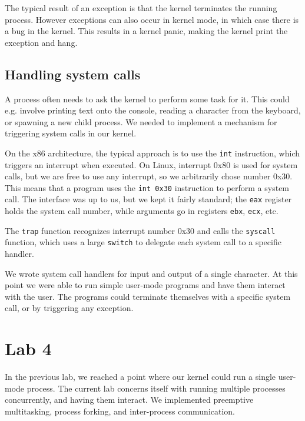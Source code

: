 \documentclass{article}
\begin{document}
The typical result of an exception is that the kernel terminates the running
process. However exceptions can also occur in kernel mode, in which case there
is a bug in the kernel. This results in a kernel panic, making the kernel
print the exception and hang.



\subsection{Handling system calls}
A process often needs to ask the kernel to perform some task for it. This
could e.g. involve printing text onto the console, reading a character from
the keyboard, or spawning a new child process. We needed to implement a
mechanism for triggering system calls in our kernel.

On the x86 architecture, the typical approach is to use the \texttt{int}
instruction, which triggers an interrupt when executed. On Linux, interrupt
0x80 is used for system calls, but we are free to use any interrupt, so we
arbitrarily chose number 0x30. This means that a program uses the \texttt{int
0x30} instruction to perform a system call. The interface was up to us, but we
kept it fairly standard; the \texttt{eax} register holds the system call
number, while arguments go in registers \texttt{ebx}, \texttt{ecx}, etc.

The \texttt{trap} function recognizes interrupt number 0x30 and calls the
\texttt{syscall} function, which uses a large \texttt{switch} to delegate each
system call to a specific handler.

We wrote system call handlers for input and output of a single character. At
this point we were able to run simple user-mode programs and have them
interact with the user. The programs could terminate themselves with a
specific system call, or by triggering any exception.




\section{Lab 4}
In the previous lab, we reached a point where our kernel could run a single
user-mode process. The current lab concerns itself with running multiple
processes concurrently, and having them interact. We implemented preemptive
multitasking, process forking, and inter-process communication. 
\end{document}
